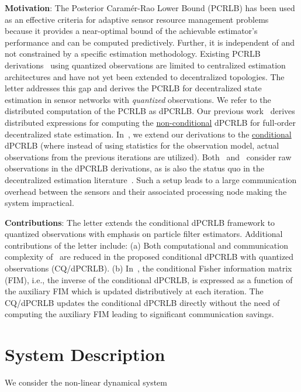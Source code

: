 \documentclass[10pt,twocolumn,twoside]{IEEEtran}
\begin{document}
\noindent
\textbf{Motivation}: The Posterior Caram\'er-Rao Lower Bound (PCRLB)
has been used as an effective criteria for adaptive sensor resource
management problems~\cite{Tharmarasa:2011,Zuo:2011} because it
provides a near-optimal bound of the achievable estimator's
performance and can be computed predictively. Further, it is
independent of and not constrained by a specific estimation
methodology.  Existing PCRLB
derivations~\cite{Msechu:2008,Zhou:2010,Duan:2008}
using quantized observations are limited to centralized estimation
architectures and have not yet been extended to decentralized
topologies.
The letter addresses this gap and derives the PCRLB for decentralized
state estimation in sensor networks with \textit{quantized}
observations. We refer to the distributed computation of the PCRLB as
dPCRLB.  Our previous work~\cite{Arash:TSP1} derives distributed
expressions for computing the \underline{non-conditional} dPCRLB for
full-order decentralized state estimation.  In~\cite{Arash:SPL}, we
extend our derivations to the \underline{conditional} dPCRLB (where
instead of using statistics for the observation model, actual
observations from the previous iterations are utilized).
Both~\cite{Arash:TSP1} and~\cite{Arash:SPL} consider raw observations
in the dPCRLB derivations, as is also the status quo in the
decentralized estimation literature~\cite{Tharmarasa:2011}.  Such a
setup leads to a large communication overhead between the sensors and
their associated processing node making the system impractical.

\noindent
\textbf{Contributions}: The letter extends the conditional dPCRLB
framework to quantized observations with emphasis on particle filter
estimators. Additional contributions of the letter include:
\noindent
(a) Both computational and communication complexity
of~\cite{Arash:SPL} are reduced in the proposed conditional dPCRLB
with quantized observations (CQ/dPCRLB).  (b) In~\cite{Arash:SPL}, the
conditional Fisher information matrix (FIM), i.e., the inverse of the
conditional dPCRLB, is expressed as a function of the auxiliary FIM
which is updated distributively at each iteration.  The CQ/dPCRLB updates the
conditional dPCRLB directly without the need of computing the
auxiliary FIM leading to significant communication savings.

\section{System Description} \label{sec:background}
We consider the non-linear dynamical system
\end{document}
